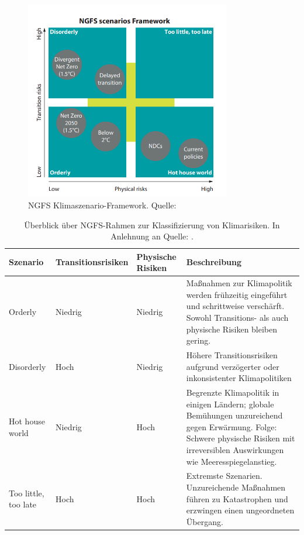 \begin{figure}[htbp]
    \centering
    \includegraphics[width=0.8\textwidth]{figures/NGFS.png}
    \caption{NGFS Klimaszenario-Framework. Quelle: \textcite{NGFS2021}}
    \label{fig:ngfs}
\end{figure}
\FloatBarrier

\begin{table}[htbp]
    \centering
    \small
    \caption{Überblick über NGFS-Rahmen zur Klassifizierung von Klimarisiken. In Anlehnung an Quelle: \textcite{NGFS2021}.}
    \label{tab:ngfs-framework}
    \begin{tabularx}{1.0\textwidth}{>{\raggedright\arraybackslash}X >{\centering\arraybackslash}X >{\centering\arraybackslash}X >{\raggedright\arraybackslash}X}
        \toprule
        \textbf{Szenario} & \textbf{Transitionsrisiken} & \textbf{Physische Risiken} & \textbf{Beschreibung} \\
        \midrule
        Orderly & Niedrig & Niedrig & Maßnahmen zur Klimapolitik werden frühzeitig eingeführt und schrittweise verschärft. Sowohl Transitions- als auch physische Risiken bleiben gering. \\
        \addlinespace
        Disorderly & Hoch & Niedrig & Höhere Transitionsrisiken aufgrund verzögerter oder inkonsistenter Klimapolitiken \\
        \addlinespace
        Hot house world & Niedrig & Hoch & Begrenzte Klimapolitik in einigen Ländern; globale Bemühungen unzureichend gegen Erwärmung. Folge: Schwere physische Risiken mit irreversiblen Auswirkungen wie Meeresspiegelanstieg.\\
        \addlinespace
        Too little, too late & Hoch & Hoch & Extremste Szenarien. Unzureichende Maßnahmen führen zu Katastrophen und erzwingen einen ungeordneten Übergang. \\
        \bottomrule
    \end{tabularx}
\end{table}
\FloatBarrier

